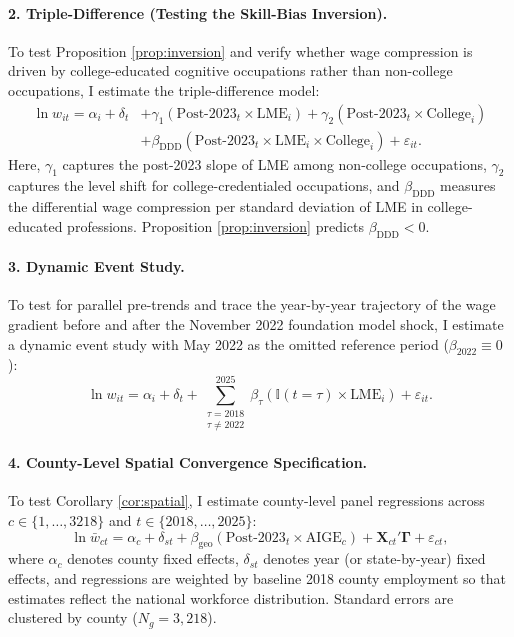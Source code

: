 \documentclass[12pt]{article}
\begin{document}
\paragraph{2. Triple-Difference (Testing the Skill-Bias Inversion).}
To test Proposition \ref{prop:inversion} and verify whether wage compression is driven by college-educated cognitive occupations rather than non-college occupations, I estimate the triple-difference model:
\begin{equation}
\label{eq:did_triple}
\begin{split}
\ln w_{it} = \alpha_i + \delta_t &+ \gamma_1 \left( \text{Post-2023}_t \times \text{LME}_i \right) + \gamma_2 \left( \text{Post-2023}_t \times \text{College}_i \right) \\
&+ \beta_{\text{DDD}} \left( \text{Post-2023}_t \times \text{LME}_i \times \text{College}_i \right) + \varepsilon_{it}.
\end{split}
\end{equation}
Here, $\gamma_1$ captures the post-2023 slope of LME among non-college occupations, $\gamma_2$ captures the level shift for college-credentialed occupations, and $\beta_{\text{DDD}}$ measures the differential wage compression per standard deviation of LME in college-educated professions. Proposition \ref{prop:inversion} predicts $\beta_{\text{DDD}} < 0$.

\paragraph{3. Dynamic Event Study.}
To test for parallel pre-trends and trace the year-by-year trajectory of the wage gradient before and after the November 2022 foundation model shock, I estimate a dynamic event study with May 2022 as the omitted reference period ($\beta_{2022} \equiv 0$):
\begin{equation}
\label{eq:event_study}
\ln w_{it} = \alpha_i + \delta_t + \sum_{\substack{\tau = 2018 \\ \tau \ne 2022}}^{2025} \beta_\tau \left( \mathbb{I}(t = \tau) \times \text{LME}_i \right) + \varepsilon_{it}.
\end{equation}

\paragraph{4. County-Level Spatial Convergence Specification.}
To test Corollary \ref{cor:spatial}, I estimate county-level panel regressions across $c \in \{1, \dots, 3218\}$ and $t \in \{2018, \dots, 2025\}$:
\begin{equation}
\label{eq:county_twfe}
\ln \bar{w}_{ct} = \alpha_c + \delta_{st} + \beta_{\text{geo}} \left( \text{Post-2023}_t \times \text{AIGE}_c \right) + \mathbf{X}_{ct}' \boldsymbol{\Gamma} + \varepsilon_{ct},
\end{equation}
where $\alpha_c$ denotes county fixed effects, $\delta_{st}$ denotes year (or state-by-year) fixed effects, and regressions are weighted by baseline 2018 county employment so that estimates reflect the national workforce distribution. Standard errors are clustered by county ($N_g = 3,218$).
\end{document}
